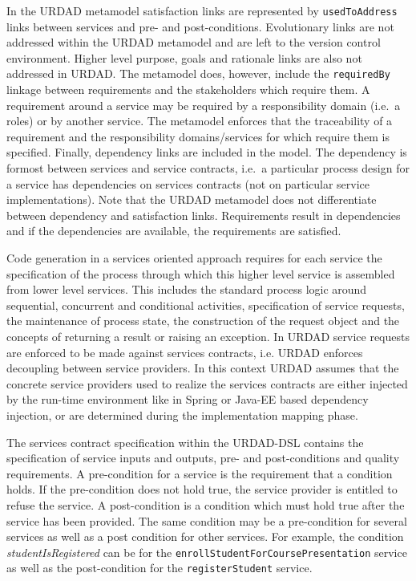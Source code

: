 In the URDAD metamodel satisfaction links are represented by \verb+usedToAddress+ links between services and pre- and post-conditions. Evolutionary links are not addressed within the URDAD metamodel and are left to the version control environment. Higher level purpose, goals and rationale links are also not addressed in URDAD. The metamodel does, however, include the \verb+requiredBy+ linkage between requirements and the stakeholders which require them. A requirement around a service may be required by a responsibility domain (i.e.\ a roles) or by another service. The metamodel enforces that the traceability of a requirement and the responsibility domains/services for which require them is specified. Finally, dependency links are included in the model. The dependency is formost between services and service contracts, i.e.\ a particular process design for a service has dependencies on services contracts (not on particular service implementations). Note that the URDAD metamodel does not differentiate between dependency and satisfaction links. Requirements result in dependencies and if the dependencies are available, the requirements are satisfied.

Code generation in a services oriented approach requires for each service the specification of the process through which this higher level service is assembled from lower level services. This includes the standard process logic around sequential, concurrent and conditional activities, specification of service requests, the maintenance of process state, the construction of the request object and the concepts of returning a result or raising an exception. In URDAD service requests are enforced to be made against services contracts, i.e. URDAD enforces decoupling between service providers. In this context URDAD assumes that the concrete service providers used to realize the services contracts are either injected by the run-time environment like in Spring or Java-EE based dependency injection, or are determined during the implementation mapping phase.

The services contract specification within the URDAD-DSL contains the specification of service inputs and outputs, pre- and post-conditions and quality requirements. A pre-condition for a service is the requirement that a condition holds. If the pre-condition does not hold true, the service provider is entitled to refuse the service. A post-condition is a condition which must hold true after the service has been provided. The same condition may be a pre-condition for several services as well as a post condition for other services. For example, the condition \emph{studentIsRegistered} can be for the \verb+enrollStudentForCoursePresentation+ service as well as the post-condition for the \verb+registerStudent+ service. 

